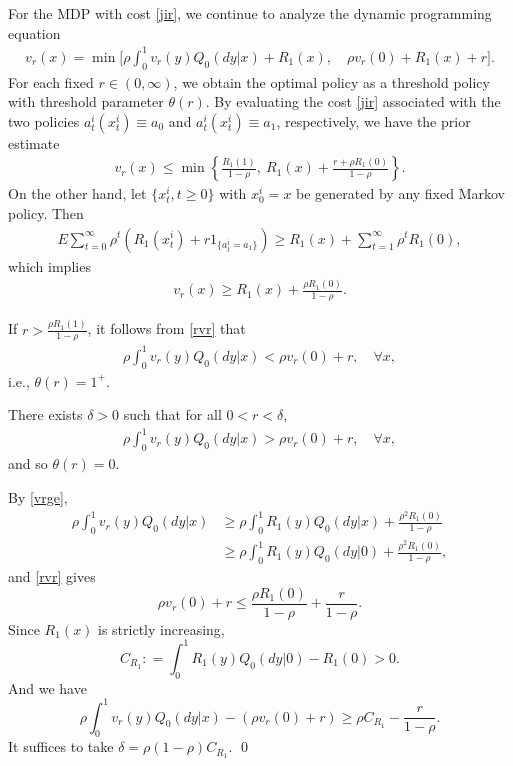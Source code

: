 \documentclass[graybox]{svmult}
\begin{document}
For the MDP with cost
\eqref{jir},
we continue to analyze the  dynamic programming equation
\begin{align}\label{Vstab}
v_r(x) =  \min \Big[\rho \int_0^1 v_r( y) Q_0(dy|x) + R_1(x),  \quad \rho v_r(0) + R_1(x)+ r\Big].
\end{align}
For each fixed $r \in (0, \infty )$, we obtain the optimal policy as a threshold policy with threshold parameter $\theta(r)$.
 By evaluating the cost \eqref{jir}   associated with  the two policies
 $a_t^i(x_t^i)\equiv a_0$ and $a_t^i(x_t^i)\equiv a_1$, respectively,  we have the prior estimate
\begin{align}
 v_r(x)\le \min\left\{ \frac{R_1(1)}{1-\rho },\ R_1(x)+\frac{r +\rho R_1(0) }{1-\rho}   \right\}. \label{rvr}
\end{align}
On the other hand, let $\{x_t^i, t\ge 0\}$ with $x_0^i=x$ be generated by any fixed Markov policy. Then
\begin{align}
E\sum_{t=0}^\infty \rho^t (R_1(x_t^i)+ r 1_{\{a_t^i=a_1\}})\ge R_1(x) +
\sum_{t=1}^\infty \rho^t R_1(0), \nonumber
\end{align}
which implies
\begin{align}
v_r(x)\ge R_1(x)+\frac{\rho R_1(0)  }{1-\rho }. \label{vrge}
\end{align}

If $r>\frac{\rho R_1(1)}{1-\rho }$, it follows from \eqref{rvr} that
\begin{align}
\rho \int_0^1 v_r( y) Q_0(dy|x) < \rho v_r(0)+r,   \quad \forall x,  \label{th1}
\end{align}
i.e., $\theta(r)=1^+$.

\begin{lemma}\label{lemma:th0}
There exists $\delta>0$ such that for all $0<r<\delta$,
\begin{align}
\rho \int_0^1 v_r( y) Q_0(dy|x)> \rho v_r(0)+r, \quad \forall x,  \label{th0}
\end{align}
and so $\theta(r)=0$.
\end{lemma}

\proof By \eqref{vrge},
\begin{align}
\rho \int_0^1 v_r( y) Q_0(dy|x) &\ge \rho\int_0^1 R_1(y) Q_0(dy|x)
+\frac{\rho^2 R_1(0)}{1-\rho } \nonumber \\
 & \ge \rho\int_0^1 R_1(y) Q_0(dy|0)
+\frac{\rho^2 R_1(0)}{1-\rho }  , \nonumber
\end{align}
and \eqref{rvr} gives
$$
\rho v_r(0)+r \le
\frac{ \rho R_1(0)}{1-\rho }+
\frac{ r }{1-\rho }.
$$
Since $R_1(x)$ is strictly increasing,
$$
C_{R_1}: =\int_0^1 R_1(y) Q_0(dy|0)- R_1(0)>0.
$$
And we have
$$
\rho \int_0^1 v_r( y) Q_0(dy|x)- (\rho v_r(0)+r) \ge \rho C_{R_1}- \frac{r}{1-\rho}.
$$
It suffices to take $\delta =\rho (1-\rho) C_{R_1}.$ \qed
\end{document}
